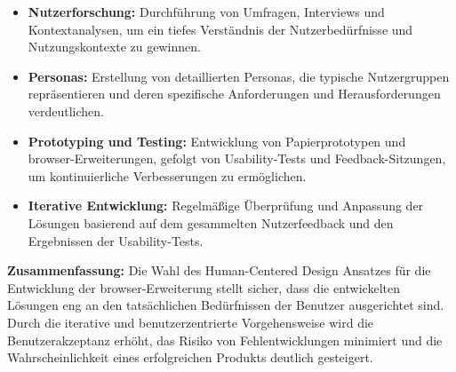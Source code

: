 \begin{itemize}
    \item \textbf{Nutzerforschung:} Durchführung von Umfragen, Interviews und Kontextanalysen, um ein tiefes Verständnis der Nutzerbedürfnisse und Nutzungskontexte zu gewinnen.
    \item \textbf{Personas:} Erstellung von detaillierten Personas, die typische Nutzergruppen repräsentieren und deren spezifische Anforderungen und Herausforderungen verdeutlichen.
    \item \textbf{Prototyping und Testing:} Entwicklung von Papierprototypen und \gls{browser}-Erweiterungen, gefolgt von Usability-Tests und Feedback-Sitzungen, um kontinuierliche Verbesserungen zu ermöglichen.
    \item \textbf{Iterative Entwicklung:} Regelmäßige Überprüfung und Anpassung der Lösungen basierend auf dem gesammelten Nutzerfeedback und den Ergebnissen der Usability-Tests.
\end{itemize}

\textbf{Zusammenfassung:}
Die Wahl des Human-Centered Design Ansatzes für die Entwicklung der \gls{browser}-Erweiterung stellt sicher, dass die entwickelten Lösungen eng an den tatsächlichen Bedürfnissen der Benutzer ausgerichtet sind. Durch die iterative und benutzerzentrierte Vorgehensweise wird die Benutzerakzeptanz erhöht, das Risiko von Fehlentwicklungen minimiert und die Wahrscheinlichkeit eines erfolgreichen Produkts deutlich gesteigert.




